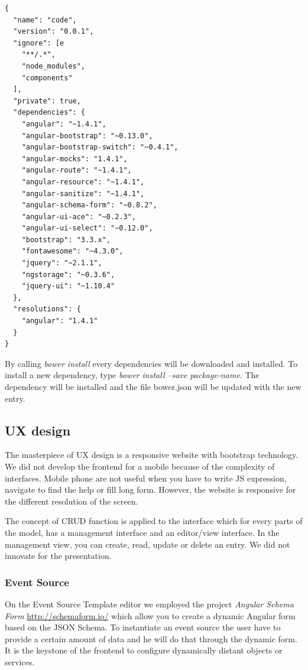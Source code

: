 \begin{lstlisting}
{
  "name": "code",
  "version": "0.0.1",
  "ignore": [e
    "**/.*",
    "node_modules",
    "components"
  ],
  "private": true,
  "dependencies": {
    "angular": "~1.4.1",
    "angular-bootstrap": "~0.13.0",
    "angular-bootstrap-switch": "~0.4.1",
    "angular-mocks": "1.4.1",
    "angular-route": "~1.4.1",
    "angular-resource": "~1.4.1",
    "angular-sanitize": "~1.4.1",
    "angular-schema-form": "~0.8.2",
    "angular-ui-ace": "~0.2.3",
    "angular-ui-select": "~0.12.0",
    "bootstrap": "3.3.x",
    "fontawesome": "~4.3.0",
    "jquery": "~2.1.1",
    "ngstorage": "~0.3.6",
    "jquery-ui": "~1.10.4"
  },
  "resolutions": {
    "angular": "1.4.1"
  }
}
\end{lstlisting}

By calling \emph{bower install} every dependencies will be downloaded and installed. To install a new dependency, type \emph{bower install --save package-name}. The dependency will be installed and the file bower.json will be updated with the new entry. 

\subsection{UX design}
The masterpiece of UX design is a responsive website with bootstrap technology. We did not develop the frontend for a mobile because of the complexity of interfaces. Mobile phone are not useful when you have to write JS expression, navigate to find the help or fill long form. However, the website is responsive for the different resolution of the screen. 

The concept of CRUD function is applied to the interface which for every parts of the model, has a management interface and an editor/view interface. In the management view, you can create, read, update or delete an entry. We did not innovate for the presentation. 

\subsubsection{Event Source}
On the Event Source Template editor we employed the project \emph{Angular Schema Form} \url{http://schemaform.io/} which allow you to create a dynamic Angular form based on the JSON Schema. To instantiate an event source the user have to provide a certain amount of data and he will do that through the dynamic form. It is the keystone of the frontend to configure dynamically distant objects or services. 

